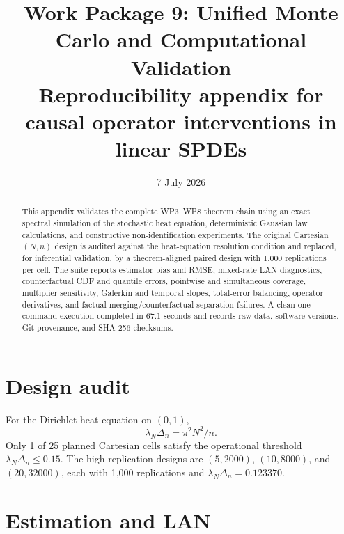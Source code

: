 \documentclass[11pt]{article}
\title{Work Package 9: Unified Monte Carlo and Computational Validation\\\large Reproducibility appendix for causal operator interventions in linear SPDEs}
\author{}
\date{7 July 2026}
\begin{document}
\maketitle
\begin{abstract}
This appendix validates the complete WP3--WP8 theorem chain using an exact spectral simulation of the stochastic heat equation, deterministic Gaussian law calculations, and constructive non-identification experiments. The original Cartesian $(N,n)$ design is audited against the heat-equation resolution condition and replaced, for inferential validation, by a theorem-aligned paired design with 1,000 replications per cell. The suite reports estimator bias and RMSE, mixed-rate LAN diagnostics, counterfactual CDF and quantile errors, pointwise and simultaneous coverage, multiplier sensitivity, Galerkin and temporal slopes, total-error balancing, operator derivatives, and factual-merging/counterfactual-separation failures. A clean one-command execution completed in 67.1 seconds and records raw data, software versions, Git provenance, and SHA-256 checksums.
\end{abstract}

\section{Design audit}
For the Dirichlet heat equation on $(0,1)$,
\[
 \lambda_N\Delta_n=\pi^2N^2/n.
\]
Only 1 of 25 planned Cartesian cells satisfy the operational threshold $\lambda_N\Delta_n\le0.15$. The high-replication designs are $(5,2000)$, $(10,8000)$, and $(20,32000)$, each with 1,000 replications and $\lambda_N\Delta_n=0.123370$.

\section{Estimation and LAN}
%
\end{document}
